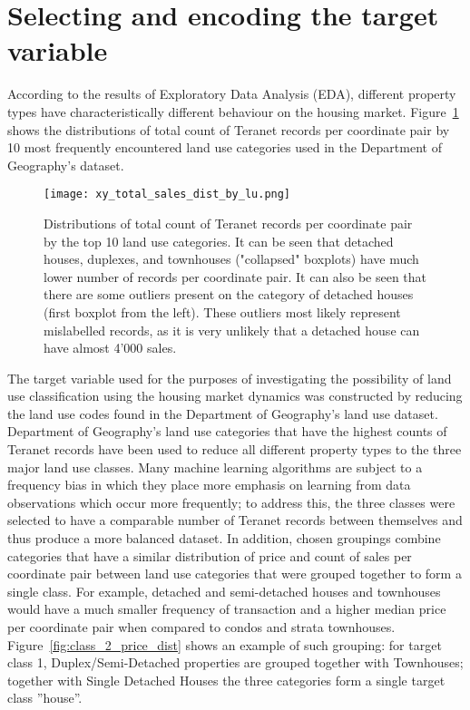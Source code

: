 \section{Selecting and encoding the target variable} \label{sec:select_encode_target}

According to the results of Exploratory Data Analysis (EDA), different property types have characteristically different behaviour on the housing market.
Figure~\ref{fig:xy_total_sales_dist_by_lu} shows the distributions of total count of Teranet records per coordinate pair by 10 most frequently encountered land use categories used in the Department of Geography's dataset.

\begin{figure}[hbt!]
    \centering
    \texttt{[image: xy\_total\_sales\_dist\_by\_lu.png]}
    \caption{Distributions of total count of Teranet records per coordinate pair by the top 10 land use categories.
    It can be seen that detached houses, duplexes, and townhouses ("collapsed" boxplots) have much lower number of records per coordinate pair.
    It can also be seen that there are some outliers present on the category of detached houses (first boxplot from the left).
    These outliers most likely represent mislabelled records, as it is very unlikely that a detached house can have almost 4'000 sales.}
    \label{fig:xy_total_sales_dist_by_lu}
\end{figure}

The target variable used for the purposes of investigating the possibility of land use classification using the housing market dynamics was constructed by reducing the land use codes found in the Department of Geography's land use dataset.
Department of Geography's land use categories that have the highest counts of Teranet records have been used to reduce all different property types to the three major land use classes.
Many machine learning algorithms are subject to a frequency bias in which they place more emphasis on learning from data observations which occur more frequently;
to address this, the three classes were selected to have a comparable number of Teranet records between themselves and thus produce a more balanced dataset.
In addition, chosen groupings combine categories that have a similar distribution of price and count of sales per coordinate pair between land use categories that were grouped together to form a single class.
For example, detached and semi-detached houses and townhouses would have a much smaller frequency of transaction and a higher median price per coordinate pair when compared to condos and strata townhouses.
Figure~\ref{fig:class_2_price_dist} shows an example of such grouping: for target class 1, Duplex/Semi-Detached properties are grouped together with Townhouses;
together with Single Detached Houses the three categories form a single target class ''house''.

